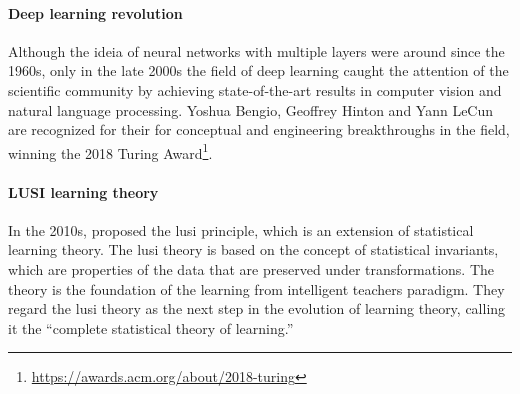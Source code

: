 \paragraph{Deep learning revolution}

Although the ideia of neural networks with multiple layers were around since the 1960s,
only in the late 2000s the field of deep learning caught the attention of the scientific
community by achieving state-of-the-art results in computer vision and natural language
processing.  Yoshua Bengio, Geoffrey
Hinton and Yann LeCun are recognized for their for conceptual and engineering
breakthroughs in the field, winning the 2018 Turing Award\footnote{\url{https://awards.acm.org/about/2018-turing}}.

%

%

\paragraph{LUSI learning theory}

In the 2010s, \citeauthor{Vapnik2015} proposed the \gls{lusi}
principle, which is an extension of statistical learning theory.  The \gls{lusi}
theory is based on the concept of statistical invariants, which are properties of
the data that are preserved under transformations.  The theory is the foundation of the
learning from intelligent teachers paradigm.  They regard the \gls{lusi} theory as the
next step in the evolution of learning theory, calling it the ``complete statistical
theory of learning.''

